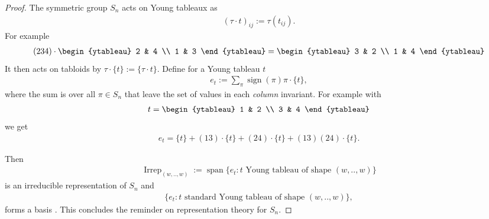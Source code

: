 \documentclass{scrartcl}
\theoremstyle{plain}
\theoremstyle{definition}
\newcommand{\1}[1]{1_{\{#1\}}}
\newcommand{\sign}{\operatorname{sign}}
\begin{document}
\begin{proof}
  The symmetric group $S_n$ acts on Young tableaux as
  \begin{align*}
    (\tau \cdot t)_{ij} := \tau( t_{ij} ).
  \end{align*}
  For example
  \begin{align*}
    (234) \cdot
    \begin{ytableau}
      2  & 4 \\
      1  & 3
    \end{ytableau}
    =
    \begin{ytableau}
      3  & 2 \\
      1  & 4
    \end{ytableau}
  \end{align*}
  It then acts on tabloids by $\tau \cdot \{t\} := \{ \tau \cdot t \}$.
  Define for a Young tableau $t$ 
  \begin{align*}
    e_t := \sum_{\pi} \sign(\pi) \pi \cdot \{ t \},
  \end{align*}
  where the sum is over all $\pi \in S_n$ that leave the set of values in each \emph{column} invariant.
  For example with 
  \begin{align*}
    t =
    \begin{ytableau}
      1  & 2 \\
      3  & 4
    \end{ytableau}
  \end{align*}
  we get
  \begin{align*}
    e_t
    =   
    \{ t \}
    +
    (1 3) \cdot \{ t \}
    +
    (2 4) \cdot \{ t \}
    +
    (1 3) (2 4) \cdot \{t\}.
  \end{align*}

  Then
  \begin{align*}
    \operatorname{Irrep}_{(w,..,w)}
    := \operatorname{span}\{ e_t : t \text{ Young tableau of shape } (w,..,w) \}
  \end{align*}
  is an irreducible representation of $S_n$ and
  \begin{align*}
    \{ e_t : t \text{ standard Young tableau of shape $(w,..,w)$}  \},
  \end{align*}
  forms a basis \cite[Theorem 2.5.2]{bib:Sag2013}.
  This concludes the reminder on representation theory for $S_n$.



\end{proof}
\end{document}
